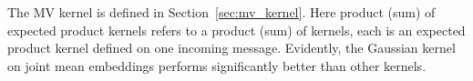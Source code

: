 \documentclass[english]{article}
\theoremstyle{plain}
\theoremstyle{plain}
\newcommand{\secref}[1]{Section~\ref{#1}}
\begin{document}
The MV kernel is defined in \secref{sec:mv_kernel}. 
Here product (sum) of expected product kernels refers to a product (sum) of kernels, each 
is an expected product kernel defined on one incoming message. Evidently, the Gaussian 
kernel on joint mean embeddings performs significantly better than other kernels. 

\end{document}
